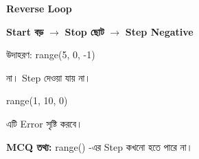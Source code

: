 \begin{rememberbox}

\textbf{\color{deepOrange}Reverse Loop}

\begin{center}

\textbf{Start বড়}
\(\longrightarrow\)
\textbf{Stop ছোট}
\(\longrightarrow\)
\textbf{Step Negative}

\end{center}

উদাহরণ:
\textenglish{\ttfamily range(5, 0, -1)}

\end{rememberbox}



না। Step
\textenglish{}
দেওয়া যায় না।

\begin{codebox}
\begin{english}
\ttfamily
range(1, 10, 0)
\end{english}
\end{codebox}

এটি Error সৃষ্টি করবে।

\begin{rememberbox}

\textbf{\color{deepOrange}MCQ তথ্য:}
\quad
\textenglish{\ttfamily range()}
-এর Step কখনো
\textenglish{}
হতে পারে না।

\end{rememberbox}



